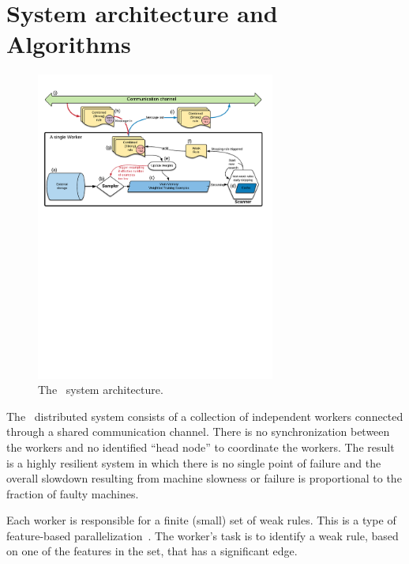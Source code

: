 \section{System architecture and Algorithms} \label{sec:Algorithms}

\begin{figure}
\centering
    \includegraphics[width=0.7\textwidth]{architecture.pdf}
    \caption{The \Sparrow\ system architecture.}\label{fig:architecture}
    \vspace{0pt}
\end{figure}

The \Sparrow\ distributed system consists of a collection of independent workers
connected through a shared communication channel. There is no
synchronization between the workers and no identified ``head node'' to
coordinate the workers. The result is a highly resilient system in which
there is no single point of failure and the overall slowdown resulting
from machine slowness or failure is proportional to the fraction of
faulty machines.

Each worker is responsible for a finite (small) set of weak
rules. This is a type of feature-based
parallelization~\cite{caragea_framework_2004}. The worker's task is to
identify a weak rule, based on one of the features in the set, that has
a significant edge.

